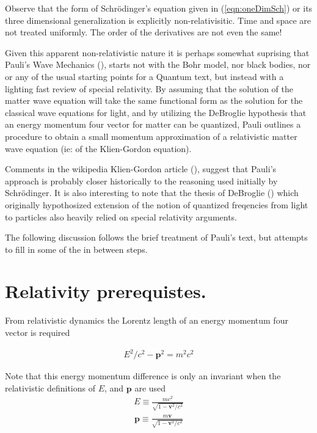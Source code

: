 \documentclass[]{eliblog}
\newcommand{\Bp}[0]{\mathbf{p}}
\newcommand{\Bv}[0]{\mathbf{v}}
\begin{document}
Observe that the form of Schr\"{o}dinger's equation given in (\ref{eqn:oneDimSch}) or its three dimensional generalization is
explicitly non-relativisitic.  Time and space are not treated uniformly.  The order of the derivatives are not
even the same!

Given this apparent non-relativistic nature it is perhaps somewhat suprising that Pauli's Wave Mechanics (\cite{pauli2000wm}),
starts not with the Bohr model, nor black bodies, nor or any of the usual starting points for a Quantum text,
but instead with a lighting fast review of special relativity.
By assuming that the solution of the matter wave equation will take the same functional form as the solution for the classical wave equations
for light, and
by utilizing the
DeBroglie hypothesis that an energy momentum four vector for matter can be quantized, Pauli 
outlines a procedure to obtain a small momentum approximation of a relativistic matter wave equation (ie: of the Klien-Gordon equation).

Comments in
the wikipedia Klien-Gordon article (\cite{wikiKG}), suggest that Pauli's approach is probably closer historically to
the reasoning used initially
by Schr\"{o}dinger.  It is also interesting to note that the thesis of DeBroglie (\cite{AFkracklauerDeBroglie}) which
originally hypothosized extension of the notion of quantized freqencies from light to particles 
also heavily relied on special relativity arguments.

The following discussion follows the brief treatment of Pauli's text, but attempts to fill in some of the in between steps.

\section{Relativity prerequistes.}

From relativistic dynamics the Lorentz length of an energy momentum four vector is required

\begin{align}
E^2/c^2 - \Bp^2 = m^2 c^2
\end{align}

Note that this energy momentum difference is only an invariant when the relativistic definitions of $E$, and $\Bp$
are used
\begin{align}
E \equiv \frac{m c^2}{\sqrt{1 - \Bv^2/c^2}}
\end{align}
\begin{align}
\Bp \equiv \frac{m \Bv}{\sqrt{1 - \Bv^2/c^2}}
\end{align}
\end{document}

